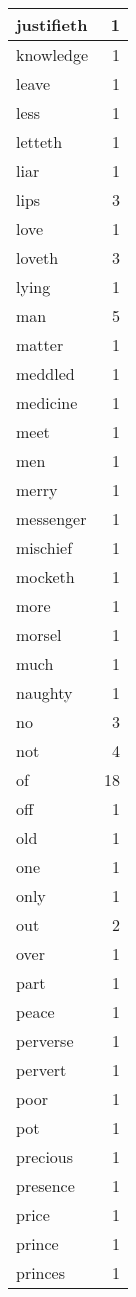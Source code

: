 \begin{center}
\begin{longtable}{l|r}
justifieth & 1\\ \hline 
knowledge & 1\\ \hline 
leave & 1\\ \hline 
less & 1\\ \hline 
letteth & 1\\ \hline 
liar & 1\\ \hline 
lips & 3\\ \hline 
love & 1\\ \hline 
loveth & 3\\ \hline 
lying & 1\\ \hline 
man & 5\\ \hline 
matter & 1\\ \hline 
meddled & 1\\ \hline 
medicine & 1\\ \hline 
meet & 1\\ \hline 
men & 1\\ \hline 
merry & 1\\ \hline 
messenger & 1\\ \hline 
mischief & 1\\ \hline 
mocketh & 1\\ \hline 
more & 1\\ \hline 
morsel & 1\\ \hline 
much & 1\\ \hline 
naughty & 1\\ \hline 
no & 3\\ \hline 
not & 4\\ \hline 
of & 18\\ \hline 
off & 1\\ \hline 
old & 1\\ \hline 
one & 1\\ \hline 
only & 1\\ \hline 
out & 2\\ \hline 
over & 1\\ \hline 
part & 1\\ \hline 
peace & 1\\ \hline 
perverse & 1\\ \hline 
pervert & 1\\ \hline 
poor & 1\\ \hline 
pot & 1\\ \hline 
precious & 1\\ \hline 
presence & 1\\ \hline 
price & 1\\ \hline 
prince & 1\\ \hline 
princes & 1\\ \hline 

\end{longtable}
\end{center}
